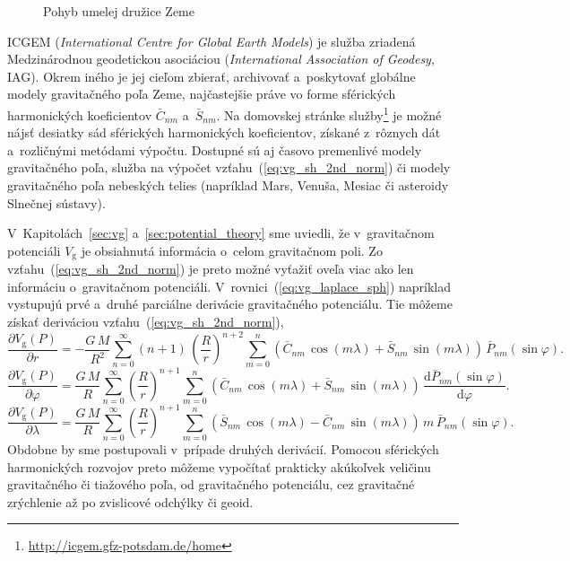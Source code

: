 \documentclass[a4paper, 12pt]{book}
\newcommand{\diff}{\mathrm d}
\newcommand{\gidx}{\mathrm g}
\begin{document}
\begin{figure}
\centering

\caption{Pohyb umelej družice Zeme}
\label{fig:orbital_motion_real}
\end{figure}

ICGEM (\emph{International Centre for Global Earth Models}) je služba zriadená
Medzinárodnou geodetickou asociáciou (\emph{International Association of
Geodesy}, IAG).  Okrem iného je jej cieľom zbierať, archivovať a~poskytovať
globálne modely gravitačného poľa Zeme, najčastejšie práve vo forme sférických
harmonických koeficientov $\bar{C}_{nm}$ a~$\bar{S}_{nm}$.  Na domovskej
stránke služby\footnote{\url{http://icgem.gfz-potsdam.de/home}} je možné nájsť
desiatky sád sférických harmonických koeficientov, získané z~rôznych dát
a~rozličnými metódami výpočtu.  Dostupné sú aj časovo premenlivé modely
gravitačného poľa, služba na výpočet vzťahu~(\ref{eq:vg_sh_2nd_norm}) či modely
gravitačného poľa nebeských telies (napríklad Mars, Venuša, Mesiac či asteroidy
Slnečnej sústavy).

V~Kapitolách~\ref{sec:vg} a~\ref{sec:potential_theory} sme uviedli, že
v~gravitačnom potenciáli $V_\gidx$ je obsiahnutá informácia o~celom gravitačnom
poli.  Zo vzťahu~(\ref{eq:vg_sh_2nd_norm}) je preto možné vyťažiť oveľa viac
ako len informáciu o~gravitačnom potenciáli.
V~rovnici~(\ref{eq:vg_laplace_sph}) napríklad vystupujú prvé a~druhé parciálne
derivácie gravitačného potenciálu.  Tie môžeme získať deriváciou
vzťahu~(\ref{eq:vg_sh_2nd_norm}),
%
\begin{equation}
\label{eq:vgr_sh_2nd_norm}
\frac{\partial V_\gidx(P)}{\partial r} = - \frac{G \, M}{R^2} \sum_{n
= 0}^\infty (n + 1) \, \left( \frac{R}{r} \right)^{n + 2} \sum_{m = 0}^{n}
\left( \bar{C}_{nm} \, \cos(m\lambda) + \bar{S}_{nm} \, \sin(m\lambda)\right)
\, \bar{P}_{nm}(\sin\varphi){.}
\end{equation}
%
\begin{equation}
\label{eq:vglat_sh_2nd_norm}
\frac{\partial V_\gidx(P)}{\partial \varphi} = \frac{G \, M}{R} \sum_{n
= 0}^\infty \left( \frac{R}{r} \right)^{n + 1} \sum_{m = 0}^{n} \left(
\bar{C}_{nm} \, \cos(m\lambda) + \bar{S}_{nm} \, \sin(m\lambda)\right) \,
\frac{\diff \bar{P}_{nm}(\sin\varphi)}{\diff \varphi}{.}
\end{equation}
%
\begin{equation}
\label{eq:vglon_sh_2nd_norm}
\frac{\partial V_\gidx(P)}{\partial \lambda} = \frac{G \, M}{R} \sum_{n
= 0}^\infty \left( \frac{R}{r} \right)^{n + 1} \sum_{m = 0}^{n}\left(
\bar{S}_{nm} \, \cos(m\lambda) - \bar{C}_{nm} \, \sin(m\lambda)\right) \, m \,
\bar{P}_{nm}(\sin\varphi){.}
\end{equation}
%
Obdobne by sme postupovali v~prípade druhých derivácií.  Pomocou sférických
harmonických rozvojov preto môžeme vypočítať prakticky akúkoľvek veličinu
gravitačného či tiažového poľa, od gravitačného potenciálu, cez gravitačné
zrýchlenie až po zvislicové odchýlky či geoid.
\end{document}
